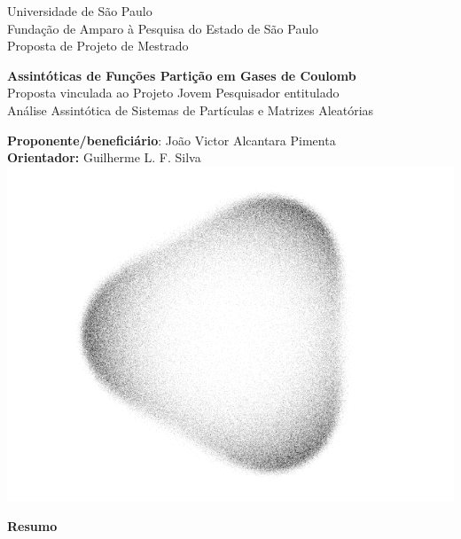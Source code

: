 \documentclass[12pt,a4paper]{article}
\numberwithin{equation}{section} %
\begin{document}
\doublespacing

\begin{titlepage}
    \begin{center}
        {\large \sc Universidade de São Paulo} \\
        {\large \sc Fundação de Amparo à Pesquisa do Estado de São Paulo}\\
        {\large \sc Proposta de Projeto de Mestrado}
        
        \vspace{1cm}

        {\Large \bfseries Assintóticas de Funções Partição em Gases de Coulomb} \\
        \vspace{1cm}
		{\small \sc Proposta vinculada ao Projeto Jovem Pesquisador entitulado} \\
		{\small \sc Análise Assintótica de Sistemas de Partículas e Matrizes Aleatórias} \\
		\vspace{1cm}

        {\small \sc \textbf{Proponente/beneficiário}: João Victor Alcantara Pimenta}\\
        {\small \sc \textbf{Orientador:} Guilherme L. F. Silva}\\[0.5cm]
        
        \includegraphics[scale=0.30]{Assets/CuteCircleWhite2}
        
    \end{center}

    \vfill

    \begin{center}
        {\bf \large Resumo} \\[1em]
    \end{center}
    

    
\end{titlepage}
\end{document}
